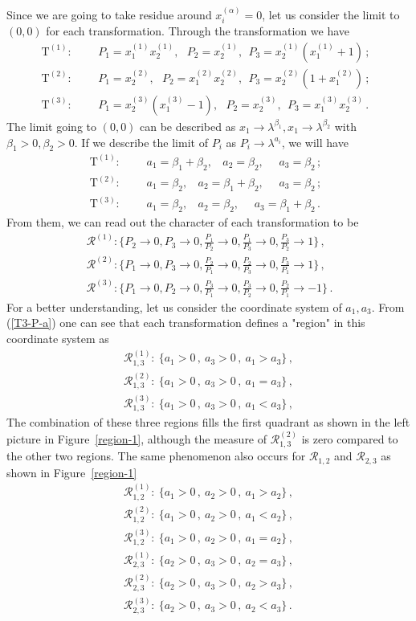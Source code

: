 \documentclass[a4paper,11pt]{article}
\newcommand{\nn}{\nonumber}
\newcommand{\nT}{\mathrm{T}}
\newcommand{\bea}{\begin{eqnarray}}
\newcommand{\eea}{\end{eqnarray}}
\newcommand{\nnn}{\nonumber\\}
\def\eref#1{(\ref{#1})}
\begin{document}
Since we are going to take residue around $x_i^{(\alpha)}=0$, 
let us consider  the  limit to $(0,0)$ for each transformation. Through the transformation we have 
\bea \nT^{(1)}:&~~~ & P_1=x_1^{(1)} x_2^{(1)},~~~P_2=x_2^{(1)},~~P_3=x_2^{(1)}(x_1^{(1)}+1)  \, ; \nnn
%
\nT^{(2)}:&~~~ & P_1=x_2^{(2)},~~~P_2=x_1^{(2)}  x_2^{(2)},~~P_3=x_2^{(2)}(1+x_1^{(2)})  \, ; \nnn
%
\nT^{(3)}:&~~~ & P_1=x_2^{(3)}(x_1^{(3)}-1),~~~P_2=x_2^{(3)},~~P_3=x_1^{(3)} x_2^{(3)}  \, .
	~~~\label{T3-P}\eea
The limit going to $(0,0)$ can be described as $x_1\to \lambda^{\beta_1}, x_1\to \lambda^{\beta_2}$ with $\beta_1>0,\beta_2>0$. If we describe the limit of $P_i$ as $P_i\to \lambda^{a_i}$, we will have 
\bea \nT^{(1)}:&~~~ & a_1=\beta_1+\beta_2,~~~~a_2=\beta_2,~~~~~~a_3=\beta_2 \, ;\nnn
%
\nT^{(2)}:&~~~ & a_1=\beta_2,~~~~a_2=\beta_1+\beta_2,~~~~~~a_3=\beta_2 \, ;\nnn
%
\nT^{(3)}:&~~~ & a_1=\beta_2,~~~~a_2=\beta_2,~~~~~~a_3=\beta_1+\beta_2 \, .
~~~\label{T3-P-a}\eea
%
From them, we can read out  the character of  each transformation to be 
\begin{align}
	&\mathcal{R}^{(1)}: \{P_2\to 0,P_3\to 0,\frac{P_1}{P_2}\to 0,\frac{P_1}{P_3}\to 0,\frac{P_3}{P_2}\to 1 \} \, , \nn\\
	&\mathcal{R}^{(2)}:  \{P_1\to 0,P_3\to 0,\frac{P_2}{P_1}\to 0,\frac{P_2}{P_3}\to 0,\frac{P_3}{P_1}\to 1 \}  \, , \nn\\
	&\mathcal{R}^{(3)}: \{P_1\to 0,P_2\to 0,\frac{P_3}{P_1}\to 0,\frac{P_3}{P_2}\to 0,\frac{P_2}{P_1}\to -1 \}     \, .~~~\label{reg}
\end{align}
For a better understanding, let us consider the coordinate system of $a_1,a_3$. 
From \eref{T3-P-a} one can  see that  each transformation defines a "region" in this coordinate system  as 
\begin{align}
	\mathcal{R}^{(1)}_{1,3}:\   \{ a_1>0\,,\ a_3>0\,,\ a_1>a_3  \} \, ,\nn\\
	\mathcal{R}^{(2)}_{1,3}:\   \{ a_1>0\,,\ a_3>0\,,\ a_1=a_3  \} \, , \nn\\
	\mathcal{R}^{(3)}_{1,3}:\   \{ a_1>0\,,\ a_3>0\,,\ a_1<a_3  \} \, ,
\end{align}
The combination of these three regions fills the first quadrant as shown in the left picture in Figure~\ref{region-1},
although the measure of $\mathcal{R}^{(2)}_{1,3}$ is zero compared to the other two regions. The same phenomenon also occurs  for $\mathcal{R}_{1,2}$ and $\mathcal{R}_{2,3}$ as shown in  Figure~\ref{region-1}
\begin{align}
	\mathcal{R}^{(1)}_{1,2}:\   \{ a_1>0\,,\ a_2>0\,,\ a_1>a_2  \} \, ,\nn\\
	\mathcal{R}^{(2)}_{1,2}:\   \{ a_1>0\,,\ a_2>0\,,\ a_1<a_2  \} \, , \nn\\
	\mathcal{R}^{(3)}_{1,2}:\   \{ a_1>0\,,\ a_2>0\,,\ a_1=a_2  \} \, ,\nn\\
	\mathcal{R}^{(1)}_{2,3}:\   \{ a_2>0\,,\ a_3>0\,,\ a_2=a_3  \} \, ,\nn\\
	\mathcal{R}^{(2)}_{2,3}:\   \{ a_2>0\,,\ a_3>0\,,\ a_2>a_3  \} \, , \nn\\
	\mathcal{R}^{(3)}_{2,3}:\   \{ a_2>0\,,\ a_3>0\,,\ a_2<a_3  \} \, .
\end{align}
\end{document}
